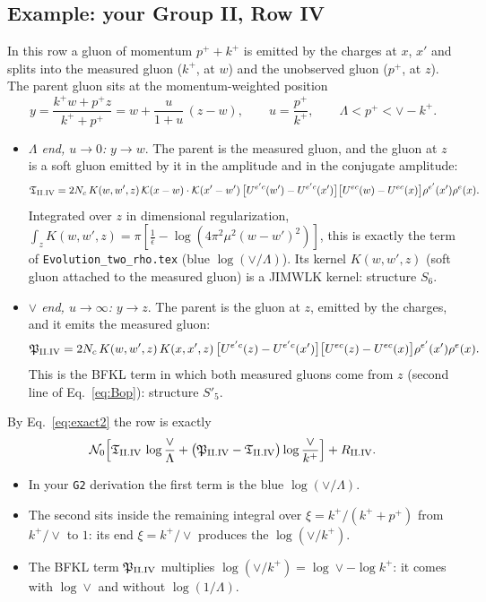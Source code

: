\documentclass[10pt]{article}
\numberwithin{equation}{section}
\newcommand{\KK}{\mathcal K}
\newcommand{\NO}{\mathcal N_0}
\newcommand{\T}{\mathfrak T}
\newcommand{\PP}{\mathfrak P}
\begin{document}
\subsection{Example: your Group II, Row IV}\label{sec:example}
In this row a gluon of momentum $p^++k^+$ is emitted by the charges at $x$, $x'$ and splits into the measured gluon ($k^+$, at $w$) and the unobserved gluon ($p^+$, at $z$). The parent gluon sits at the momentum-weighted position
\begin{equation}
y=\frac{k^+w+p^+z}{k^++p^+}=w+\frac{u}{1+u}\,(z-w),\qquad u=\frac{p^+}{k^+},\qquad \Lambda<p^+<\vee-k^+ .
\end{equation}
\begin{itemize}
\item \emph{$\Lambda$ end, $u\to0$:} $y\to w$. The parent is the measured gluon, and the gluon at $z$ is a soft gluon emitted by it in the amplitude and in the conjugate amplitude:
\begin{equation}
\T_{\rm II.IV}=2N_c\,K(w,w',z)\,\KK(x-w)\cdot\KK(x'-w')\,\big[U^{e'c}(w')-U^{e'c}(x')\big]\big[U^{ec}(w)-U^{ec}(x)\big]\rho^{e'}(x')\rho^e(x).
\end{equation}
Integrated over $z$ in dimensional regularization, $\int_zK(w,w',z)=\pi[\frac1{\bar\epsilon}-\log(4\pi^2\mu^2(w-w')^2)]$, this is exactly the term of \texttt{Evolution\_two\_rho.tex} (blue $\log(\vee/\Lambda)$). Its kernel $K(w,w',z)$ (soft gluon attached to the measured gluon) is a JIMWLK kernel: structure $S_6$.
\item \emph{$\vee$ end, $u\to\infty$:} $y\to z$. The parent is the gluon at $z$, emitted by the charges, and it emits the measured gluon:
\begin{equation}
\PP_{\rm II.IV}=2N_c\,K(w,w',z)\,K(x,x',z)\,\big[U^{e'c}(z)-U^{e'c}(x')\big]\big[U^{ec}(z)-U^{ec}(x)\big]\rho^{e'}(x')\rho^e(x).
\end{equation}
This is the BFKL term in which both measured gluons come from $z$ (second line of Eq.~\eqref{eq:Bop}): structure $S'_5$.
\end{itemize}
By Eq.~\eqref{eq:exact2} the row is exactly
\begin{equation}
\NO\Big[\T_{\rm II.IV}\,\log\frac{\vee}{\Lambda}+\big(\PP_{\rm II.IV}-\T_{\rm II.IV}\big)\log\frac{\vee}{k^+}\Big]+R_{\rm II.IV}.
\end{equation}
\begin{itemize}
\item In your \texttt{G2} derivation the first term is the blue $\log(\vee/\Lambda)$.
\item The second sits inside the remaining integral over $\xi=k^+/(k^++p^+)$ from $k^+/\vee$ to $1$: its end $\xi=k^+/\vee$ produces the $\log(\vee/k^+)$.
\item The BFKL term $\PP_{\rm II.IV}$ multiplies $\log(\vee/k^+)=\log\vee-\log k^+$: it comes with $\log\vee$ and without $\log(1/\Lambda)$.
\end{itemize}
\end{document}
